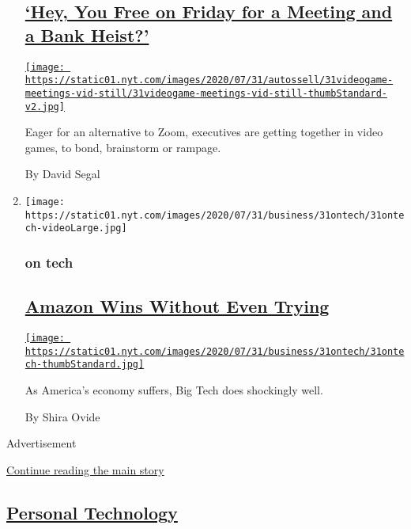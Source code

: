 \begin{enumerate}
  \hypertarget{hey-you-free-on-friday-for-a-meeting-and-a-bank-heist}{%
  \subsection{\texorpdfstring{\href{/2020/07/31/business/video-game-meetings.html}{`Hey,
  You Free on Friday for a Meeting and a Bank
  Heist?'}}{`Hey, You Free on Friday for a Meeting and a Bank Heist?'}}\label{hey-you-free-on-friday-for-a-meeting-and-a-bank-heist}}

  \href{/2020/07/31/business/video-game-meetings.html}{\texttt{[image: https://static01.nyt.com/images/2020/07/31/autossell/31videogame-meetings-vid-still/31videogame-meetings-vid-still-thumbStandard-v2.jpg]}}

  Eager for an alternative to Zoom, executives are getting together in
  video games, to bond, brainstorm or rampage.

  By David Segal
\item
  \texttt{[image: https://static01.nyt.com/images/2020/07/31/business/31ontech/31ontech-videoLarge.jpg]}

  \hypertarget{on-tech}{%
  \subsubsection{on tech}\label{on-tech}}

  \hypertarget{amazon-wins-without-even-trying}{%
  \subsection{\texorpdfstring{\href{/2020/07/31/technology/amazon-earnings.html}{Amazon
  Wins Without Even
  Trying}}{Amazon Wins Without Even Trying}}\label{amazon-wins-without-even-trying}}

  \href{/2020/07/31/technology/amazon-earnings.html}{\texttt{[image: https://static01.nyt.com/images/2020/07/31/business/31ontech/31ontech-thumbStandard.jpg]}}

  As America's economy suffers, Big Tech does shockingly well.

  By Shira Ovide
\end{enumerate}

Advertisement

\protect\hyperlink{after-mid1}{Continue reading the main story}

\hypertarget{personal-technology}{%
\subsection{\texorpdfstring{\href{/section/technology/personaltech}{Personal
Technology}}{Personal Technology}}\label{personal-technology}}

